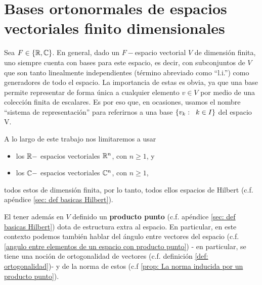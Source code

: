 \section{Bases ortonormales de espacios vectoriales finito dimensionales}

Sea $F \in \{ \mathbb{R}, \mathbb{C} \}$.  
En general, dado un $F-$espacio vectorial $V$ de dimensión finita,
uno siempre cuenta con 
bases para este espacio,
es decir, con subconjuntos de $V$ que son tanto linealmente
independientes (término abreviado como ``l.i.'') como generadores
de todo el espacio. La importancia de 
estas es obvia, ya que una base permite representar
de forma única a cualquier elemento $v \in V$ por medio
de una colección finita de escalares.
Es por eso que, en ocasiones,
usamos el nombre ``sistema de representación''
para referirnos a
una base $\{ v_{k} : \hspace{0.2cm} k \in I \}$
del espacio V.

A lo largo de este trabajo
nos limitaremos a usar
\begin{itemize}
\item los $\mathbb{R}-$ espacios vectoriales $\mathbb{R}^{n}$, con $n \geq 1$, y
\item los $\mathbb{C}-$ espacios vectoriales $\mathbb{C}^{n}$, con $n \geq 1$, 
\end{itemize}
todos estos de dimensión finita, por lo tanto,
todos ellos espacios de Hilbert 
(c.f. apéndice 
\ref{sec: def basicas Hilbert}).

El tener además en $V$ definido un \textbf{producto punto}
(c.f. apéndice \ref{sec: def basicas Hilbert})
dota de estructura extra al espacio. En particular, 
en este contexto podemos también hablar del ángulo entre vectores
del espacio (c.f.
\ref{angulo entre elementos de un espacio con producto punto})
- en particular, se tiene una noción 
de ortogonalidad de vectores
(c.f. definición \ref{def: ortogonalidad})-
y de la norma de estos
(c.f \ref{prop: La norma inducida por un producto punto}).

